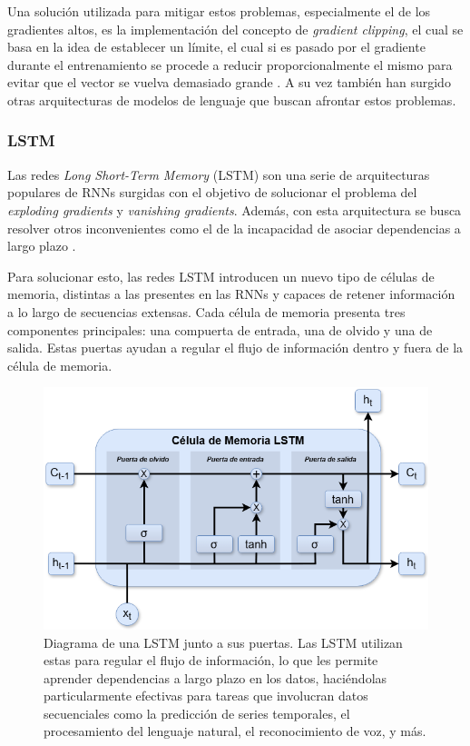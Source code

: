 Una solución utilizada para mitigar estos problemas, especialmente el de los gradientes altos, es la implementación del concepto de \textit{gradient clipping}, el cual se basa en la idea de establecer un límite, el cual si es pasado por el gradiente durante el entrenamiento se procede a reducir proporcionalmente el mismo para evitar que el vector se vuelva demasiado grande  \parencite{pascanu2013difficultytrainingrecurrentneural}. A su vez también han surgido otras arquitecturas de modelos de lenguaje que buscan afrontar estos problemas.

\subsubsection{LSTM}

Las redes \textit{Long Short-Term Memory} (LSTM) son una serie de arquitecturas populares de RNNs surgidas con el objetivo de solucionar el problema del \textit{exploding gradients} y \textit{vanishing gradients}. Además, con esta arquitectura se busca resolver otros inconvenientes como el de la incapacidad de asociar dependencias a largo plazo \parencite{lstm}.

Para solucionar esto, las redes LSTM introducen un nuevo tipo de células de memoria, distintas a las presentes en las RNNs y capaces de retener información a lo largo de secuencias extensas. Cada célula de memoria presenta tres componentes principales: una compuerta de entrada, una de olvido y una de salida. Estas puertas ayudan a regular el flujo de información dentro y fuera de la célula de memoria.

\begin{figure}[H]
    \centering
    \includegraphics[width=1\textwidth]{imagenes/LSTM.png}
    \caption{Diagrama de una LSTM junto a sus puertas. Las LSTM utilizan estas para regular el flujo de información, lo que les permite aprender dependencias a largo plazo en los datos, haciéndolas particularmente efectivas para tareas que involucran datos secuenciales como la predicción de series temporales, el procesamiento del lenguaje natural, el reconocimiento de voz, y más.}
    \label{fig:lstm}
\end{figure}


